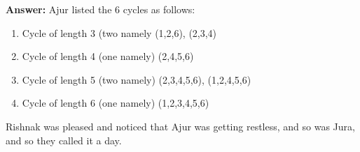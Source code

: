 \textbf{Answer:} Ajur listed the 6 cycles as follows:
\begin{enumerate}
    \item Cycle of length 3 (two namely  (1,2,6), (2,3,4)
    \item Cycle of length 4 (one namely) (2,4,5,6)
    \item Cycle of length 5 (two namely) (2,3,4,5,6), (1,2,4,5,6)
    \item Cycle of length 6 (one namely) (1,2,3,4,5,6)
\end{enumerate}
Rishnak  was pleased and noticed that Ajur was getting restless, and so was Jura, and so they called it a day.